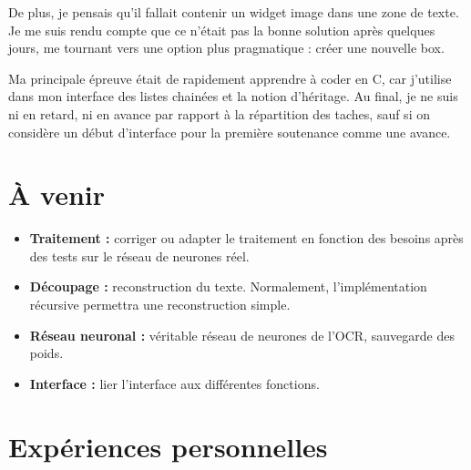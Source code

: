 \documentclass[12pt]{report}
\begin{document}
De plus, je pensais qu’il fallait contenir un widget image dans une zone de texte. Je me suis rendu compte que ce n’était pas la bonne solution après quelques jours, me tournant vers une option plus pragmatique : créer une nouvelle box.

Ma principale épreuve était de rapidement apprendre à coder en C, car j’utilise dans mon interface des listes chainées et la notion d’héritage.
Au final, je ne suis ni en retard, ni en avance par rapport à la répartition des taches, sauf si on considère un début d'interface pour la première soutenance comme une avance.

\chapter{À venir}

\begin{itemize}
	\item \textbf{Traitement :} corriger ou adapter le traitement en fonction des besoins après des tests sur le réseau de neurones réel.
	\item \textbf{Découpage :} reconstruction du texte. Normalement, l'implémentation récursive permettra une reconstruction simple.
	\item \textbf{Réseau neuronal :} véritable réseau de neurones de l'OCR, sauvegarde des poids.
	\item \textbf{Interface :} lier l'interface aux différentes fonctions.
\end{itemize}

\chapter{Expériences personnelles}
\end{document}
